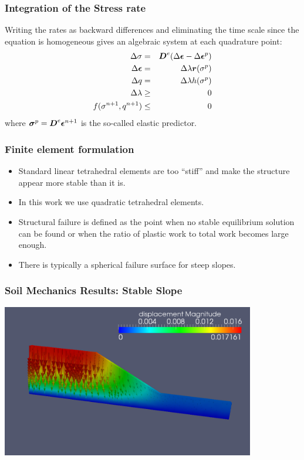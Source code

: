 \documentclass{beamer}
\begin{document}
\begin{frame}
  \frametitle{Integration of the Stress rate} Writing the rates as
  backward differences and eliminating the time scale since the
  equation is homogeneous gives an algebraic system at each quadrature
  point:
  \begin{eqnarray}
    \Delta \sigma  &=& \mbox{{\boldmath ${D}$}}^e (\Delta \mbox{{\boldmath ${\epsilon}$}} - \Delta \mbox{{\boldmath ${\epsilon}$}}^p) \\
    \Delta \mbox{{\boldmath ${\epsilon}$}} &=& \Delta \lambda \mbox{{\boldmath ${r}$}}(\sigma^p) \\
    \Delta q &=& \Delta \lambda h(\sigma^p) \\
    \Delta \lambda &\geq& 0 \\
    f(\sigma^{n+1},q^{n+1}) &\leq& 0 
  \end{eqnarray}
where $\mbox{{\boldmath ${\sigma}$}}^p = \mbox{{\boldmath ${D}$}}^e \mbox{{\boldmath ${\epsilon}$}}^{n+1}$ is the so-called
elastic predictor.
\end{frame}

\begin{frame}
\frametitle{Finite element formulation}
\begin{itemize}
\item Standard linear tetrahedral elements are too ``stiff'' and
  make the structure appear more stable than it is.
\item In this work we use quadratic tetrahedral elements.
\item Structural failure is defined as the point when no stable
  equilibrium solution can be found or when the ratio of plastic
  work to total work becomes large enough.
\item There is typically a spherical failure surface for steep
  slopes.
\end{itemize}
\end{frame}

\begin{frame}
\frametitle{Soil Mechanics Results: Stable Slope}
\includegraphics[width=4.35in]{mcslope.png}
\end{frame}
\end{document}
